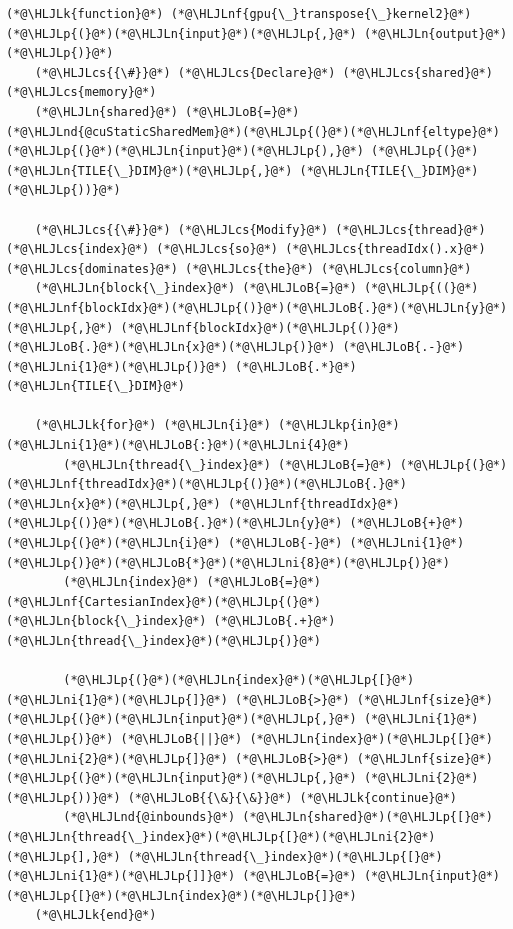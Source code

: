 \documentclass[12pt,a4paper]{article}
\newcommand{\HLJLk}[1]{\textcolor[RGB]{148,91,176}{\textbf{#1}}}
\newcommand{\HLJLkp}[1]{\textcolor[RGB]{148,91,176}{\textbf{#1}}}
\newcommand{\HLJLn}[1]{#1}
\newcommand{\HLJLnd}[1]{\textcolor[RGB]{214,102,97}{#1}}
\newcommand{\HLJLnf}[1]{\textcolor[RGB]{66,102,213}{#1}}
\newcommand{\HLJLni}[1]{\textcolor[RGB]{59,151,46}{#1}}
\newcommand{\HLJLoB}[1]{\textcolor[RGB]{102,102,102}{\textbf{#1}}}
\newcommand{\HLJLp}[1]{#1}
\newcommand{\HLJLcs}[1]{\textcolor[RGB]{153,153,119}{\textit{#1}}}
\begin{document}
\begin{lstlisting}
(*@\HLJLk{function}@*) (*@\HLJLnf{gpu{\_}transpose{\_}kernel2}@*)(*@\HLJLp{(}@*)(*@\HLJLn{input}@*)(*@\HLJLp{,}@*) (*@\HLJLn{output}@*)(*@\HLJLp{)}@*)
    (*@\HLJLcs{{\#}}@*) (*@\HLJLcs{Declare}@*) (*@\HLJLcs{shared}@*) (*@\HLJLcs{memory}@*)
    (*@\HLJLn{shared}@*) (*@\HLJLoB{=}@*) (*@\HLJLnd{@cuStaticSharedMem}@*)(*@\HLJLp{(}@*)(*@\HLJLnf{eltype}@*)(*@\HLJLp{(}@*)(*@\HLJLn{input}@*)(*@\HLJLp{),}@*) (*@\HLJLp{(}@*)(*@\HLJLn{TILE{\_}DIM}@*)(*@\HLJLp{,}@*) (*@\HLJLn{TILE{\_}DIM}@*)(*@\HLJLp{))}@*)
    
    (*@\HLJLcs{{\#}}@*) (*@\HLJLcs{Modify}@*) (*@\HLJLcs{thread}@*) (*@\HLJLcs{index}@*) (*@\HLJLcs{so}@*) (*@\HLJLcs{threadIdx().x}@*) (*@\HLJLcs{dominates}@*) (*@\HLJLcs{the}@*) (*@\HLJLcs{column}@*)
    (*@\HLJLn{block{\_}index}@*) (*@\HLJLoB{=}@*) (*@\HLJLp{((}@*)(*@\HLJLnf{blockIdx}@*)(*@\HLJLp{()}@*)(*@\HLJLoB{.}@*)(*@\HLJLn{y}@*)(*@\HLJLp{,}@*) (*@\HLJLnf{blockIdx}@*)(*@\HLJLp{()}@*)(*@\HLJLoB{.}@*)(*@\HLJLn{x}@*)(*@\HLJLp{)}@*) (*@\HLJLoB{.-}@*) (*@\HLJLni{1}@*)(*@\HLJLp{)}@*) (*@\HLJLoB{.*}@*) (*@\HLJLn{TILE{\_}DIM}@*)
    
    (*@\HLJLk{for}@*) (*@\HLJLn{i}@*) (*@\HLJLkp{in}@*) (*@\HLJLni{1}@*)(*@\HLJLoB{:}@*)(*@\HLJLni{4}@*)
        (*@\HLJLn{thread{\_}index}@*) (*@\HLJLoB{=}@*) (*@\HLJLp{(}@*)(*@\HLJLnf{threadIdx}@*)(*@\HLJLp{()}@*)(*@\HLJLoB{.}@*)(*@\HLJLn{x}@*)(*@\HLJLp{,}@*) (*@\HLJLnf{threadIdx}@*)(*@\HLJLp{()}@*)(*@\HLJLoB{.}@*)(*@\HLJLn{y}@*) (*@\HLJLoB{+}@*) (*@\HLJLp{(}@*)(*@\HLJLn{i}@*) (*@\HLJLoB{-}@*) (*@\HLJLni{1}@*)(*@\HLJLp{)}@*)(*@\HLJLoB{*}@*)(*@\HLJLni{8}@*)(*@\HLJLp{)}@*)
        (*@\HLJLn{index}@*) (*@\HLJLoB{=}@*) (*@\HLJLnf{CartesianIndex}@*)(*@\HLJLp{(}@*)(*@\HLJLn{block{\_}index}@*) (*@\HLJLoB{.+}@*) (*@\HLJLn{thread{\_}index}@*)(*@\HLJLp{)}@*)

        (*@\HLJLp{(}@*)(*@\HLJLn{index}@*)(*@\HLJLp{[}@*)(*@\HLJLni{1}@*)(*@\HLJLp{]}@*) (*@\HLJLoB{>}@*) (*@\HLJLnf{size}@*)(*@\HLJLp{(}@*)(*@\HLJLn{input}@*)(*@\HLJLp{,}@*) (*@\HLJLni{1}@*)(*@\HLJLp{)}@*) (*@\HLJLoB{||}@*) (*@\HLJLn{index}@*)(*@\HLJLp{[}@*)(*@\HLJLni{2}@*)(*@\HLJLp{]}@*) (*@\HLJLoB{>}@*) (*@\HLJLnf{size}@*)(*@\HLJLp{(}@*)(*@\HLJLn{input}@*)(*@\HLJLp{,}@*) (*@\HLJLni{2}@*)(*@\HLJLp{))}@*) (*@\HLJLoB{{\&}{\&}}@*) (*@\HLJLk{continue}@*)
        (*@\HLJLnd{@inbounds}@*) (*@\HLJLn{shared}@*)(*@\HLJLp{[}@*)(*@\HLJLn{thread{\_}index}@*)(*@\HLJLp{[}@*)(*@\HLJLni{2}@*)(*@\HLJLp{],}@*) (*@\HLJLn{thread{\_}index}@*)(*@\HLJLp{[}@*)(*@\HLJLni{1}@*)(*@\HLJLp{]]}@*) (*@\HLJLoB{=}@*) (*@\HLJLn{input}@*)(*@\HLJLp{[}@*)(*@\HLJLn{index}@*)(*@\HLJLp{]}@*)
    (*@\HLJLk{end}@*)
    

\end{lstlisting}
\end{document}
